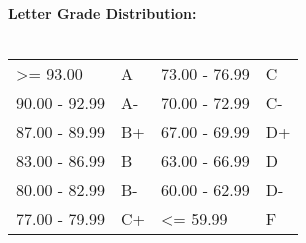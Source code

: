 \documentclass[11pt]{article}
\begin{document}
\textbf {\large Letter Grade Distribution:} \\\\
\hspace*{40mm}
\begin{tabular}{ l l | l l }
\textgreater= 93.00 & A & 73.00 - 76.99 & C \\
90.00 - 92.99 & A-  & 70.00 - 72.99 & C- \\
87.00 - 89.99 & B+  & 67.00 - 69.99 & D+ \\
83.00 - 86.99 & B  & 63.00 - 66.99 & D \\
80.00 - 82.99 & B-  & 60.00 - 62.99 & D- \\
77.00 - 79.99 & C+  & \textless= 59.99 & F \\
\end{tabular} \\
\end{document}
